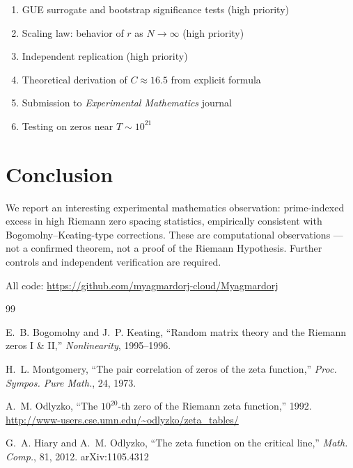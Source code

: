 \documentclass[11pt]{article}
\begin{document}
\begin{enumerate}
\item GUE surrogate and bootstrap significance tests (high priority)
\item Scaling law: behavior of $r$ as $N \to \infty$ (high priority)
\item Independent replication (high priority)
\item Theoretical derivation of $C \approx 16.5$ from explicit formula
\item Submission to \textit{Experimental Mathematics} journal
\item Testing on zeros near $T \sim 10^{21}$
\end{enumerate}

\section{Conclusion}

We report an interesting experimental mathematics observation:
prime-indexed excess in high Riemann zero spacing statistics,
empirically consistent with Bogomolny--Keating-type corrections.
These are computational observations --- not a confirmed theorem,
not a proof of the Riemann Hypothesis. Further controls and
independent verification are required.

All code: \url{https://github.com/myagmardorj-cloud/Myagmardorj}


\begin{thebibliography}{99}

E.~B. Bogomolny and J.~P. Keating,
``Random matrix theory and the Riemann zeros I \& II,''
\textit{Nonlinearity}, 1995--1996.

H.~L. Montgomery,
``The pair correlation of zeros of the zeta function,''
\textit{Proc. Sympos. Pure Math.}, 24, 1973.

A.~M. Odlyzko,
``The $10^{20}$-th zero of the Riemann zeta function,'' 1992.
\url{http://www-users.cse.umn.edu/~odlyzko/zeta_tables/}

G.~A. Hiary and A.~M. Odlyzko,
``The zeta function on the critical line,''
\textit{Math. Comp.}, 81, 2012. arXiv:1105.4312

\end{thebibliography}
\end{document}
